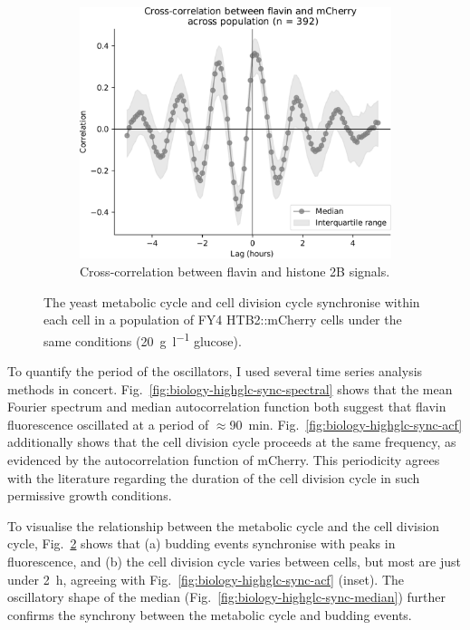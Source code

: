 \begin{figure}
  \begin{subfigure}[htpb]{0.4\textwidth}
   \centering
   \includegraphics[width=\textwidth]{xcf_edit.pdf}
   \caption{
    Cross-correlation between flavin and histone 2B signals.
   }
   \label{fig:biology-highglc-sync-xcf}
  \end{subfigure}

  \caption{
    The yeast metabolic cycle and cell division cycle synchronise within each cell in a population of FY4 HTB2::mCherry cells under the same conditions (\SI{20}{\gram~\litre^{-1}} glucose).
  }
  \label{fig:biology-highglc-sync-corr}
\end{figure}

To quantify the period of the oscillators, I used several time series analysis methods in concert.
Fig.\ \ref{fig:biology-highglc-sync-spectral} shows that the mean Fourier spectrum and median autocorrelation function both suggest that flavin fluorescence oscillated at a period of $\approx$\SI{90}{\minute}.
Fig.\ \ref{fig:biology-highglc-sync-acf} additionally shows that the cell division cycle proceeds at the same frequency, as evidenced by the autocorrelation function of mCherry.
This periodicity agrees with the literature regarding the duration of the cell division cycle in such permissive growth conditions. %

To visualise the relationship between the metabolic cycle and the cell division cycle,
Fig.\ \ref{fig:biology-highglc-sync-corr} shows that
(a) budding events synchronise with peaks in fluorescence, and
(b) the cell division cycle varies between cells,
but most are just under \SI{2}{\hour}, agreeing with Fig.\ \ref{fig:biology-highglc-sync-acf} (inset).
The oscillatory shape of the median (Fig.\ \ref{fig:biology-highglc-sync-median}) further confirms the synchrony between the metabolic cycle and budding events.

